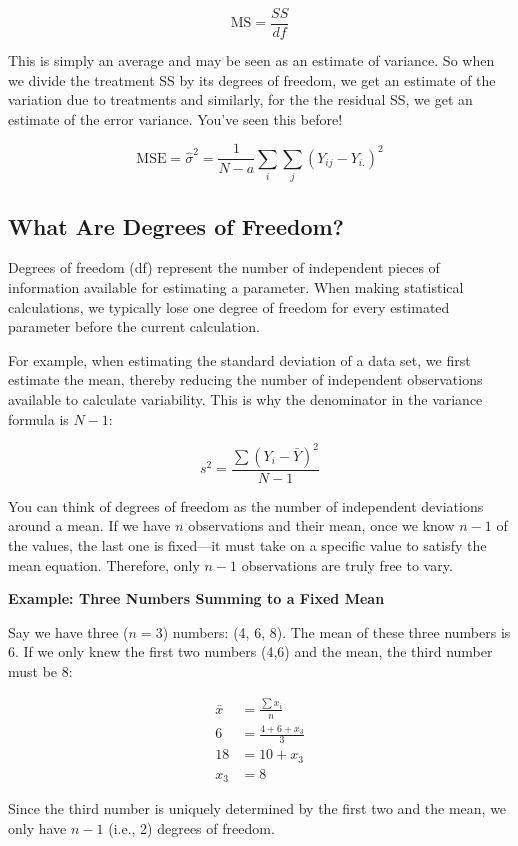 \documentclass[
  letterpaper,
]{book}
\begin{document}
\[ \text{MS} = \frac{SS}{df}\]

This is simply an average and may be seen as an estimate of variance. So
when we divide the treatment SS by its degrees of freedom, we get an
estimate of the variation due to treatments and similarly, for the the
residual SS, we get an estimate of the error variance. You've seen this
before!

\[\text{MSE} = \hat{\sigma}^2 = \frac{1}{N-a}\sum_i\sum_j(Y_{ij} - Y_{i.})^2\]

\subsection{What Are Degrees of
Freedom?}\label{what-are-degrees-of-freedom}

Degrees of freedom (df) represent the number of independent pieces of
information available for estimating a parameter. When making
statistical calculations, we typically lose one degree of freedom for
every estimated parameter before the current calculation.

For example, when estimating the standard deviation of a data set, we
first estimate the mean, thereby reducing the number of independent
observations available to calculate variability. This is why the
denominator in the variance formula is \(N-1\):

\[ s^2 = \frac{\sum(Y_i - \bar{Y})^2}{N -1} \]

You can think of degrees of freedom as the number of independent
deviations around a mean. If we have \(n\) observations and their mean,
once we know \(n-1\) of the values, the last one is fixed---it must take
on a specific value to satisfy the mean equation. Therefore, only
\(n-1\) observations are truly free to vary.

\textbf{Example: Three Numbers Summing to a Fixed Mean}

Say we have three (\(n=3\)) numbers: (4, 6, 8). The mean of these three
numbers is 6. If we only knew the first two numbers (4,6) and the mean,
the third number must be 8:

\[
\begin{aligned}
\bar{x} &= \frac{\sum x_i}{n}\\
6 &= \frac{4+6+x_3}{3}\\
18 &= 10 + x_3 \\
x_3 &= 8
\end{aligned}
\]

Since the third number is uniquely determined by the first two and the
mean, we only have \(n-1\) (i.e., 2) degrees of freedom.
\end{document}
